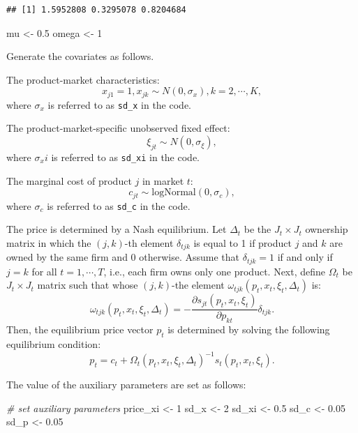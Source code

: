 \documentclass[
]{book}
\newenvironment{Shaded}{\begin{snugshade}}{\end{snugshade}}
\newcommand{\CommentTok}[1]{\textcolor[rgb]{0.56,0.35,0.01}{\textit{#1}}}
\newcommand{\DecValTok}[1]{\textcolor[rgb]{0.00,0.00,0.81}{#1}}
\newcommand{\FloatTok}[1]{\textcolor[rgb]{0.00,0.00,0.81}{#1}}
\newcommand{\NormalTok}[1]{#1}
\newcommand{\OtherTok}[1]{\textcolor[rgb]{0.56,0.35,0.01}{#1}}
\begin{document}
\begin{verbatim}
## [1] 1.5952808 0.3295078 0.8204684
\end{verbatim}

\begin{Shaded}
\begin{Highlighting}[]
\NormalTok{mu }\OtherTok{\textless{}{-}} \FloatTok{0.5}
\NormalTok{omega }\OtherTok{\textless{}{-}} \DecValTok{1}
\end{Highlighting}
\end{Shaded}

Generate the covariates as follows.

The product-market characteristics:
\[
x_{j1} = 1, x_{jk} \sim N(0, \sigma_x), k = 2, \cdots, K,
\]
where \(\sigma_x\) is referred to as \texttt{sd\_x} in the code.

The product-market-specific unobserved fixed effect:
\[
\xi_{jt} \sim N(0, \sigma_\xi),
\]
where \(\sigma_xi\) is referred to as \texttt{sd\_xi} in the code.

The marginal cost of product \(j\) in market \(t\):
\[
c_{jt} \sim \text{logNormal}(0, \sigma_c),
\]
where \(\sigma_c\) is referred to as \texttt{sd\_c} in the code.

The price is determined by a Nash equilibrium. Let \(\Delta_t\) be the \(J_t \times J_t\) ownership matrix in which the \((j, k)\)-th element \(\delta_{tjk}\) is equal to 1 if product \(j\) and \(k\) are owned by the same firm and 0 otherwise. Assume that \(\delta_{tjk} = 1\) if and only if \(j = k\) for all \(t = 1, \cdots, T\), i.e., each firm owns only one product. Next, define \(\Omega_t\) be \(J_t \times J_t\) matrix such that whose \((j, k)\)-the element \(\omega_{tjk}(p_t, x_t, \xi_t, \Delta_t)\) is:
\[
\omega_{tjk}(p_t, x_t, \xi_t, \Delta_t) = - \frac{\partial s_{jt}(p_t, x_t, \xi_t)}{\partial p_{kt}} \delta_{tjk}.
\]
Then, the equilibrium price vector \(p_t\) is determined by solving the following equilibrium condition:
\[
p_t = c_t + \Omega_t(p_t, x_t, \xi_t, \Delta_t)^{-1} s_t(p_t, x_t, \xi_t).
\]

The value of the auxiliary parameters are set as follows:

\begin{Shaded}
\begin{Highlighting}[]
\CommentTok{\# set auxiliary parameters}
\NormalTok{price\_xi }\OtherTok{\textless{}{-}} \DecValTok{1}
\NormalTok{sd\_x }\OtherTok{\textless{}{-}} \DecValTok{2}
\NormalTok{sd\_xi }\OtherTok{\textless{}{-}} \FloatTok{0.5}
\NormalTok{sd\_c }\OtherTok{\textless{}{-}} \FloatTok{0.05}
\NormalTok{sd\_p }\OtherTok{\textless{}{-}} \FloatTok{0.05}
\end{Highlighting}
\end{Shaded}
\end{document}
